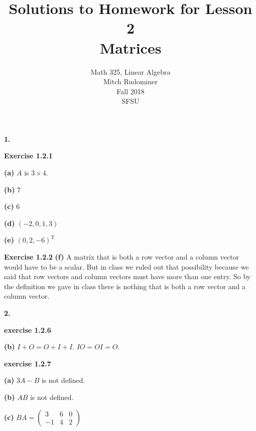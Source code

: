 \documentclass[oneside,12pt]{amsart}
\begin{document}
\title{Solutions to Homework for Lesson 2 \\ Matrices}
\author{Math 325, Linear Algebra \\ Mitch Rudominer \\ Fall 2018 \\ SFSU }
\date{}

\maketitle


\textbf{1.}

\smallskip

\textbf{Exercise 1.2.1}

\smallskip

\textbf{(a)} $A$ is $3\times 4$.

\smallskip

\textbf{(b)} 7

\smallskip

\textbf{(c)} 6

\smallskip

\textbf{(d)} $(-2, 0, 1, 3)$

\smallskip

\textbf{(e)} $(0,2, -6)^{\text{T}}$

\smallskip

\textbf{Exercise 1.2.2}
\smallskip
\textbf{(f)} A matrix that is both a row vector and a column vector would
have to be a scalar. But in class we ruled out that possibility because we said
that row vectors and column vectors must have more than one entry. So by the
definition we gave in class there is nothing that is both a row vector and
a column vector.

\smallskip

\textbf{2.}

\smallskip

\textbf{exercise 1.2.6}

\smallskip

\textbf{(b)} $I + O = O + I + I$. $I O = O I = O$.

\smallskip

\textbf{exercise 1.2.7}

\textbf{(a)} $3A - B$ is not defined.

\smallskip

\textbf{(b)} $AB$ is not defined.

\smallskip

\textbf{(c)} $BA =
\begin{pmatrix}
3 & 6 & 0 \\
-1 & 4 & 2
\end{pmatrix}
$
\end{document}
